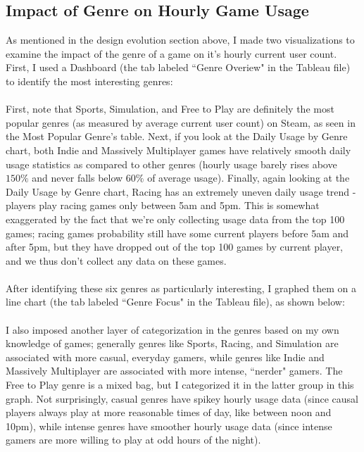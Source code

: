 \documentclass[pdftex,12pt,a4paper]{article}
\begin{document}
\subsection{Impact of Genre on Hourly Game Usage}
As mentioned in the design evolution section above, I made two visualizations to examine the impact of the genre of a game on it's hourly current user count. First, I used a Dashboard (the tab labeled ``Genre Overiew" in the Tableau file) to identify the most interesting genres: \\ \\

First, note that Sports, Simulation, and Free to Play are definitely the most popular genres (as measured by average current user count) on Steam, as seen in the Most Popular Genre's table. Next, if you look at the Daily Usage by Genre chart, both Indie and Massively Multiplayer games have relatively smooth daily usage statistics as compared to other genres (hourly usage barely rises above $150\%$ and never falls below $60\%$ of average usage). Finally, again looking at the Daily Usage by Genre chart, Racing has an extremely uneven daily usage trend - players play racing games only between 5am and 5pm. This is somewhat exaggerated by the fact that we're only collecting usage data from the top 100 games; racing games probability still have some current players before 5am and after 5pm, but they have dropped out of the top 100 games by current player, and we thus don't collect any data on these games. \\ \\
After identifying these six genres as particularly interesting, I graphed them on a line chart (the tab labeled ``Genre Focus" in the Tableau file), as shown below: \\ \\

I also imposed another layer of categorization in the genres based on my own knowledge of games; generally genres like Sports, Racing, and Simulation are associated with more casual, everyday gamers, while genres like Indie and Massively Multiplayer are associated with more intense, ``nerder" gamers. The Free to Play genre is a mixed bag, but I categorized it in the latter group in this graph. Not surprisingly, casual genres have spikey hourly usage data (since causal players always play at more reasonable times of day, like between noon and 10pm), while intense genres have smoother hourly usage data (since intense gamers are more willing to play at odd hours of the night).
\end{document}
